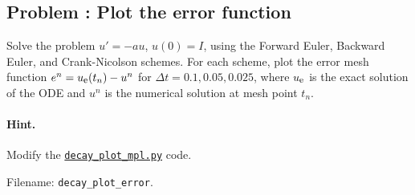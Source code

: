 \documentclass[%
oneside,                 %
final,                   %
10pt]{article}
\newenvironment{doconceexercise}{}{}
\newcounter{doconceexercisecounter}
\begin{document}
\begin{doconceexercise}

\subsection*{Problem \thedoconceexercisecounter: Plot the error function}

\label{decay:exer:plot:error}

Solve the problem $u'=-au$, $u(0)=I$, using the Forward Euler, Backward
Euler, and Crank-Nicolson schemes. For each scheme, plot the error mesh
function $e^n = \uex(t_n)-u^n$ for $\Delta t=0.1, 0.05, 0.025$,
where $\uex$ is the exact solution of the ODE and
$u^n$ is the numerical solution at mesh point $t_n$.


\paragraph{Hint.}
Modify the \href{{http://tinyurl.com/ofkw6kc/alg/decay_plot_mpl.py}}{\nolinkurl{decay_plot_mpl.py}} code.



\noindent Filename: \Verb!decay_plot_error!.

\end{doconceexercise}
\end{document}
